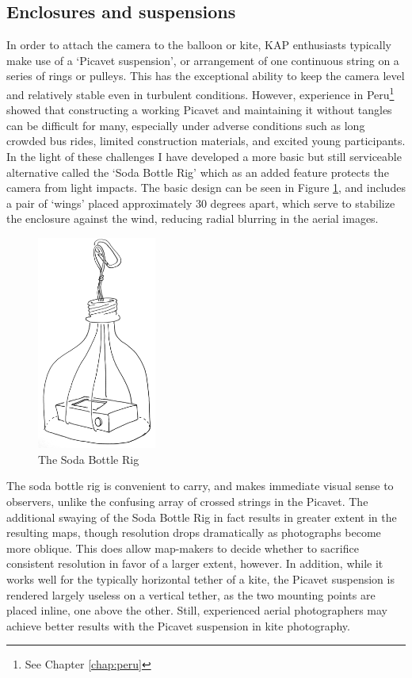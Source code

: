 \documentclass[11pt,oneside,notitlepage]{report}
\begin{document}
\subsection{Enclosures and suspensions}
\label{subsec:cameraenclosures}

In order to attach the camera to the balloon or kite, \ac{KAP} enthusiasts typically make use of a `Picavet suspension', or arrangement of one continuous string on a series of rings or pulleys. This has the exceptional ability to keep the camera level and relatively stable even in turbulent conditions. However, experience in Peru\footnote{See Chapter \ref{chap:peru}} showed that constructing a working Picavet and maintaining it without tangles can be difficult for many, especially under adverse conditions such as long crowded bus rides, limited construction materials, and excited young participants. In the light of these challenges I have developed a more basic but still serviceable alternative called the `Soda Bottle Rig' which as an added feature protects the camera from light impacts. The basic design can be seen in Figure \ref{fig:soda}, and includes a pair of `wings' placed approximately 30 degrees apart, which serve to stabilize the enclosure against the wind, reducing radial blurring in the aerial images.

\begin{figure}
	\label{fig:soda}
	\begin{flushright}
		\includegraphics[width=0.35\textwidth]{images/soda-bottle-overview.jpg}
		\caption{The Soda Bottle Rig}
	\end{flushright}
\end{figure}

The soda bottle rig is convenient to carry, and makes immediate visual sense to observers, unlike the confusing array of crossed strings in the Picavet. The additional swaying of the Soda Bottle Rig in fact results in greater extent in the resulting maps, though resolution drops dramatically as photographs become more oblique. This does allow map-makers to decide whether to sacrifice consistent resolution in favor of a larger extent, however. In addition, while it works well for the typically horizontal tether of a kite, the Picavet suspension is rendered largely useless on a vertical tether, as the two mounting points are placed inline, one above the other. Still, experienced aerial photographers may achieve better results with the Picavet suspension in kite photography.  
\end{document}
